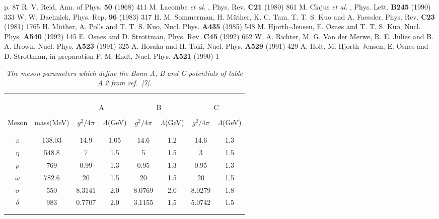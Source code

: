 {\begin{thebibliography}{99}
p. 87
 R. V. Reid, Ann. of Phys. {\bf 50} (1968) 411
 M. Lacombe {\em et al.} , Phys. Rev. {\bf C21} (1980)
861
 M. Clajus {\em et al.} , Phys. Lett. {\bf B245} (1990) 333
 W. W. Daehnick, Phys. Rep. {\bf 96} (1983) 317
 H. M. Sommerman, H. M\"{u}ther, K. C. Tam, T. T. S. Kuo
and A. Faessler, Phys. Rev. {\bf C23} (1981) 1765
 H. M\"{u}ther, A. Polls and T. T. S. Kuo, Nucl. Phys.
{\bf A435} (1985) 548
 M. Hjorth--Jensen, E. Osnes and T. T. S. Kuo,
Nucl. Phys. {\bf A540} (1992) 145
 E. Osnes and D. Strottman, Phys. Rev. {\bf C45} (1992) 662
 W. A. Richter, M. G. Van der Merwe, R. E. Julies
and B. A. Brown, Nucl. Phys. {\bf A523} (1991) 325
 A. Hosaka and H. Toki, Nucl. Phys. {\bf A529} (1991) 429
 A. Holt, M. Hjorth--Jensen, E. Osnes and D. Strottman,
in preparation
 P. M. Endt, Nucl. Phys. {\bf A521} (1990) 1

\end{thebibliography}}

\clearpage
\begin{table}[hbtp]
\caption{{\em The meson parameters which define the Bonn A, B and C
potentials of table A.2 from ref.\ [7].}}
\begin{center}
\begin{tabular}{cccccccc}
&&&&&&&\\
&&&&&&&\\ \hline
&&&&&&&\\
&&
\multicolumn{2}{c}{A}&
\multicolumn{2}{c}{B}&
\multicolumn{2}{c}{C}\\
&&&&&&&\\
\multicolumn{1}{c}{Meson}&
\multicolumn{1}{c}{mass(MeV)}&
\multicolumn{1}{c}{$g^{2}/4\pi$}&
\multicolumn{1}{c}{$\Lambda$(GeV)}&
\multicolumn{1}{c}{$g^{2}/4\pi$}&
\multicolumn{1}{c}{$\Lambda$(GeV)}&
\multicolumn{1}{c}{$g^{2}/4\pi$}&
\multicolumn{1}{c}{$\Lambda$(GeV)}
\\&&&&&&&\\  \hline&&&&&&&\\
$\pi$&138.03&14.9&1.05&14.6&1.2&14.6&1.3\\
$\eta$&548.8&7&1.5&5&1.5&3&1.5\\
$\rho$&769&0.99&1.3&0.95&1.3&0.95&1.3\\
$\omega$&782.6&20&1.5 &20&1.5&20&1.5\\
$\sigma$&550&8.3141&2.0&8.0769&2.0&8.0279&1.8\\
$\delta$&983&0.7707&2.0&3.1155&1.5&5.0742&1.5\\
 &&&&&&&\\ \hline &&&&&&&\\
\end{tabular}
\end{center} \label{tab:mespar}
\end{table}
\clearpage

